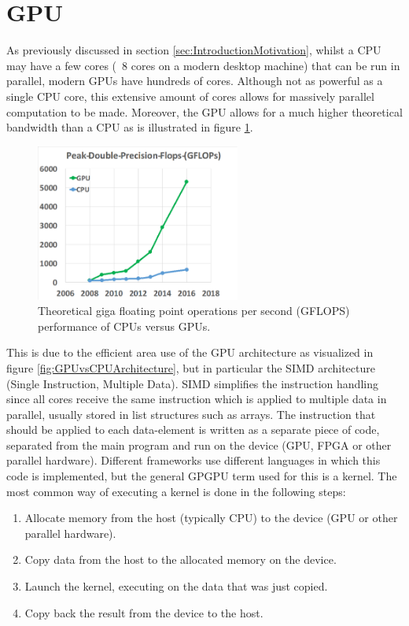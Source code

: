 \section{GPU} \label{sec:GPUTheory}
As previously discussed in section \ref{sec:IntroductionMotivation}, whilst a CPU may have a few cores (~8 cores on a modern desktop machine) that can be run in parallel, modern GPUs have hundreds of cores. Although not as powerful as a single CPU core, this extensive amount of cores allows for massively parallel computation to be made. Moreover, the GPU allows for a much higher theoretical bandwidth than a CPU as is illustrated in figure \ref{fig:GPUGFLOPS}.

\begin{figure}[!htpb]
    \centering
    \includegraphics[width=0.6\textwidth]{Theory/Figs/GFLOPSGPU.png}
    \caption{Theoretical giga floating point operations per second (GFLOPS) performance of CPUs versus GPUs. \cite{Ingemar9b}}
    \label{fig:GPUGFLOPS}
\end{figure}

\noindent This is due to the efficient area use of the GPU architecture as visualized in figure \ref{fig:GPUvsCPUArchitecture}, but in particular the SIMD architecture (Single Instruction, Multiple Data). SIMD simplifies the instruction handling since all cores receive the same instruction which is applied to multiple data in parallel, usually stored in list structures such as arrays. The instruction that should be applied to each data-element is written as a separate piece of code, separated from the main program and run on the device (GPU, FPGA or other parallel hardware). Different frameworks use different languages in which this code is implemented, but the general GPGPU term used for this is a kernel. The most common way of executing a kernel is done in the following steps:
\begin{enumerate}
    \item Allocate memory from the host (typically CPU) to the device (GPU or other parallel hardware).
    \item Copy data from the host to the allocated memory on the device.
    \item Launch the kernel, executing on the data that was just copied.
    \item Copy back the result from the device to the host.
\end{enumerate}


